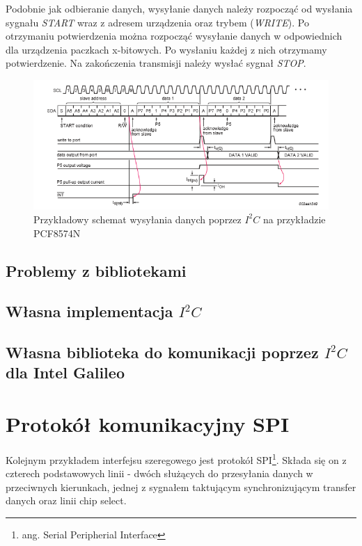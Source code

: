 \documentclass{xmgr}
\begin{document}
Podobnie jak odbieranie danych, wysyłanie danych należy rozpocząć od wysłania sygnału \emph{START} wraz z adresem urządzenia oraz trybem (\emph{WRITE}). Po otrzymaniu potwierdzenia można rozpocząć wysyłanie danych w odpowiednich dla urządzenia paczkach x-bitowych. Po wysłaniu każdej z nich otrzymamy potwierdzenie. Na zakończenia transmisji należy wysłać sygnał \emph{STOP}.

\begin{figure}[!h]
    \centering
    \includegraphics[height=0.2\textheight]{images/write_i2c.png}
    \caption{Przykładowy schemat wysyłania danych poprzez $I^2C$ na przykładzie PCF8574N\label{$I^2C$}}
\end{figure}

\subsection{Problemy z bibliotekami}
\subsection{Własna implementacja $I^2C$}
\subsection{Własna biblioteka do komunikacji poprzez $I^2C$ dla Intel Galileo}

\section{Protokół komunikacyjny SPI}
Kolejnym przykładem interfejsu szeregowego jest protokół SPI\footnote{ang. Serial Peripherial Interface}. Składa się on z czterech podstawowych linii - dwóch służących do przesyłania danych w przeciwnych kierunkach, jednej z sygnałem taktującym synchronizującym transfer danych oraz linii chip select. 
\end{document}
